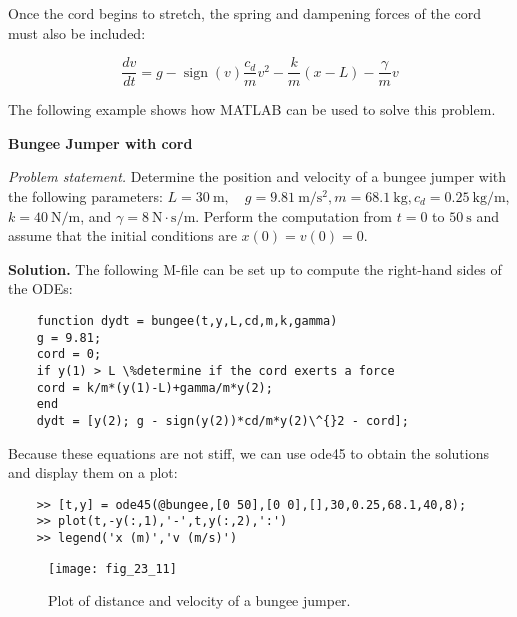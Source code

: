 \documentclass[../main.tex]{subfiles}
\begin{document}
\noindent Once the cord begins to stretch, the spring and dampening forces of the cord must also be included:

\begin{equation}
    \tag{23.27b}
    \frac{d v}{d t}=g-\operatorname{sign}(v) \frac{c_{d}}{m} v^{2}-\frac{k}{m}(x-L)-\frac{\gamma}{m} v
\end{equation}

\noindent The following example shows how MATLAB can be used to solve this problem.

\begin{exmp}
    \textbf{Bungee Jumper with cord}

    \noindent \textit{Problem statement.} Determine the position and velocity of a bungee jumper with the following parameters: $L=30 \mathrm{~m}, \quad g=9.81 \mathrm{~m} / \mathrm{s}^{2}, m=68.1 \mathrm{~kg}, c_{d}=0.25 \mathrm{~kg} / \mathrm{m}$, $k=40 \mathrm{~N} / \mathrm{m}$, and $\gamma=8 \mathrm{~N} \cdot \mathrm{s} / \mathrm{m}$. Perform the computation from $t=0$ to $50 \mathrm{~s}$ and assume that the initial conditions are $x(0)=v(0)=0$.

    \noindent \textbf{Solution.} The following M-file can be set up to compute the right-hand sides of the ODEs: %
    \begin{lstlisting}
    function dydt = bungee(t,y,L,cd,m,k,gamma)
    g = 9.81;
    cord = 0;
    if y(1) > L \%determine if the cord exerts a force
    cord = k/m*(y(1)-L)+gamma/m*y(2);
    end
    dydt = [y(2); g - sign(y(2))*cd/m*y(2)\^{}2 - cord];
    \end{lstlisting}
    

    Because these equations are not stiff, we can use ode45 to obtain the solutions and display them on a plot:
    \begin{lstlisting}
    >> [t,y] = ode45(@bungee,[0 50],[0 0],[],30,0.25,68.1,40,8);
    >> plot(t,-y(:,1),'-',t,y(:,2),':')
    >> legend('x (m)','v (m/s)')
    \end{lstlisting}
    

    \begin{figure}[H]
        \centering
        \texttt{[image: fig\_23\_11]}
       \caption{\textsf{Plot of distance and velocity of a bungee jumper.}}\label{fig:fig_23_11}
    \end{figure}
\end{exmp}
\vspace{5mm}
\end{document}

